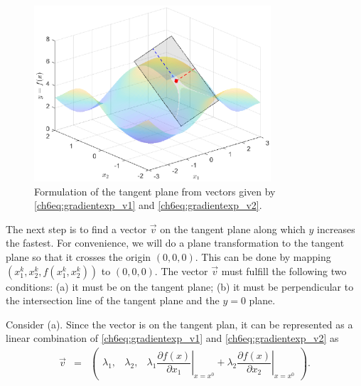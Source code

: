 \begin{figure}
	\centering
	\includegraphics[width=250pt]{chapters/chapter6/figures/gradientexp_3d3.eps}
	\caption{Formulation of the tangent plane from vectors given by \eqref{ch6eq:gradientexp_v1} and \eqref{ch6eq:gradientexp_v2}.} \label{ch6fig:gradientexp_3d3}
\end{figure}

The next step is to find a vector $\vec{v}$ on the tangent plane along which $y$ increases the fastest. For convenience, we will do a plane transformation to the tangent plane so that it crosses the origin $(0,0,0)$. This can be done by mapping $\left(x_1^k,x_2^k,f(x_1^k,x_2^k)\right)$ to $(0,0,0)$. The vector $\vec{v}$ must fulfill the following two conditions: (a) it must be on the tangent plane; (b) it must be perpendicular to the intersection line of the tangent plane and the $y=0$ plane.

Consider (a). Since the vector is on the tangent plan, it can be represented as a linear combination of \eqref{ch6eq:gradientexp_v1} and \eqref{ch6eq:gradientexp_v2} as
\begin{eqnarray}
    \vec{v}&=& \left(\begin{array}{ccc}
              \lambda_1, & \lambda_2, & \lambda_1\left.\dfrac{\partial f(x)}{\partial x_1}\right|_{x=x^0} + \lambda_2\left.\dfrac{\partial f(x)}{\partial x_2}\right|_{x=x^0}
            \end{array} \right) . \label{ch6eq:gradient_v}
\end{eqnarray}

